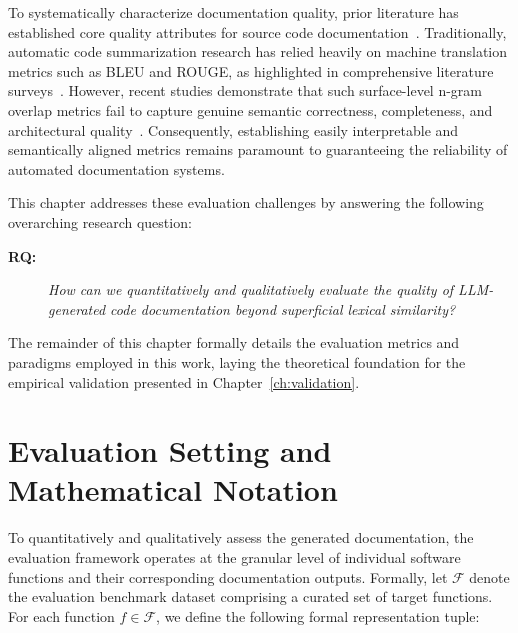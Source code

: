To systematically characterize documentation quality, prior literature has established core quality attributes for source code documentation~\cite{rai_review_2022}. Traditionally, automatic code summarization research has relied heavily on machine translation metrics such as BLEU and ROUGE, as highlighted in comprehensive literature surveys~\cite{zhang_survey_2022, zhu_automatic_2019}. However, recent studies demonstrate that such surface-level n-gram overlap metrics fail to capture genuine semantic correctness, completeness, and architectural quality~\cite{hoang_codewiki_2026}. Consequently, establishing easily interpretable and semantically aligned metrics remains paramount to guaranteeing the reliability of automated documentation systems. 

This chapter addresses these evaluation challenges by answering the following overarching research question: 

\begin{description} 
	\item[\textbf{RQ:}] \textit{How can we quantitatively and qualitatively evaluate the quality of LLM-generated code documentation beyond superficial lexical similarity?} 
\end{description} 

The remainder of this chapter formally details the evaluation metrics and paradigms employed in this work, laying the theoretical foundation for the empirical validation presented in Chapter~\ref{ch:validation}.

\section{Evaluation Setting and Mathematical Notation} \label{sec:metrics-setting} 
To quantitatively and qualitatively assess the generated documentation, the evaluation framework operates at the granular level of individual software functions and their corresponding documentation outputs. Formally, let $\mathcal{F}$ denote the evaluation benchmark dataset comprising a curated set of target functions. For each function $f \in \mathcal{F}$, we define the following formal representation tuple: 

